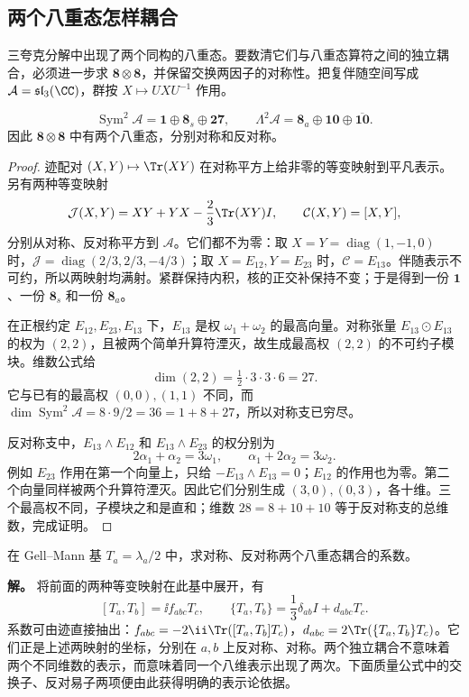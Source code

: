 \subsection{两个八重态怎样耦合}

三夸克分解中出现了两个同构的八重态。要数清它们与八重态算符之间的独立耦合，必须进一步求 $\mathbf8\otimes\mathbf8$，并保留交换两因子的对称性。把复伴随空间写成 $\mathcal A=\mathfrak{sl}_3(\CC)$，群按 $X\mapsto UXU^{-1}$ 作用。

\begin{theorem}[伴随张量平方及其交换对称性]
\begin{equation}
 \operatorname{Sym}^2\mathcal A=\mathbf1\oplus\mathbf8_s\oplus\mathbf{27},
 \qquad
 \Lambda^2\mathcal A=\mathbf8_a\oplus\mathbf{10}\oplus\overline{\mathbf{10}}.
 \label{eq:su3-adjoint-square-symmetry}
\end{equation}
因此 $\mathbf8\otimes\mathbf8$ 中有两个八重态，分别对称和反对称。
\end{theorem}
\begin{proof}
迹配对 $(X,Y)\mapsto\Tr(XY)$ 在对称平方上给非零的等变映射到平凡表示。另有两种等变映射
\[
 \mathcal J(X,Y)=XY+YX-\frac23\Tr(XY)I,
 \qquad \mathcal C(X,Y)=[X,Y],
\]
分别从对称、反对称平方到 $\mathcal A$。它们都不为零：取 $X=Y=\operatorname{diag}(1,-1,0)$ 时，$\mathcal J=\operatorname{diag}(2/3,2/3,-4/3)$；取 $X=E_{12},Y=E_{23}$ 时，$\mathcal C=E_{13}$。伴随表示不可约，所以两映射均满射。紧群保持内积，核的正交补保持不变；于是得到一份 $\mathbf1$、一份 $\mathbf8_s$ 和一份 $\mathbf8_a$。

在正根约定 $E_{12},E_{23},E_{13}$ 下，$E_{13}$ 是权 $\omega_1+\omega_2$ 的最高向量。对称张量 $E_{13}\odot E_{13}$ 的权为 $(2,2)$，且被两个简单升算符湮灭，故生成最高权 $(2,2)$ 的不可约子模块。维数公式给
\[
 \dim(2,2)=\tfrac12\cdot3\cdot3\cdot6=27.
\]
它与已有的最高权 $(0,0),(1,1)$ 不同，而 $\dim\operatorname{Sym}^2\mathcal A=8\cdot9/2=36=1+8+27$，所以对称支已穷尽。

反对称支中，$E_{13}\wedge E_{12}$ 和 $E_{13}\wedge E_{23}$ 的权分别为
\[
 2\alpha_1+\alpha_2=3\omega_1,\qquad
 \alpha_1+2\alpha_2=3\omega_2.
\]
例如 $E_{23}$ 作用在第一个向量上，只给 $-E_{13}\wedge E_{13}=0$；$E_{12}$ 的作用也为零。第二个向量同样被两个升算符湮灭。因此它们分别生成 $(3,0),(0,3)$，各十维。三个最高权不同，子模块之和是直和；维数 $28=8+10+10$ 等于反对称支的总维数，完成证明。
\end{proof}

\begin{workedexample}[对称与反对称八重态耦合]
在 Gell--Mann 基 $T_a=\lambda_a/2$ 中，求对称、反对称两个八重态耦合的系数。

\textbf{解。} 将前面的两种等变映射在此基中展开，有
\[
 [T_a,T_b]=\ii f_{abc}T_c,\qquad
 \{T_a,T_b\}=\frac13\delta_{ab}I+d_{abc}T_c.
\]
系数可由迹直接抽出：$f_{abc}=-2\ii\Tr([T_a,T_b]T_c)$，$d_{abc}=2\Tr(\{T_a,T_b\}T_c)$。它们正是上述两映射的坐标，分别在 $a,b$ 上反对称、对称。两个独立耦合不意味着两个不同维数的表示，而意味着同一个八维表示出现了两次。下面质量公式中的交换子、反对易子两项便由此获得明确的表示论依据。
\end{workedexample}

